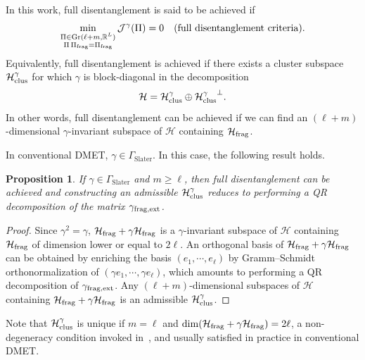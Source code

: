 \documentclass{article}
\def\R{\mathbb R}
\newtheorem{proposition}[theorem]{Proposition}
\newcommand{\1}{{\mathds 1}}
\begin{document}
\medskip

In this work, full disentanglement is said to be achieved if
\begin{equation}\label{eq:full_disentanglement}
\mathop{\rm min}_{
\substack{\Pi \in {\rm Gr}(\ell+m,\R^L) \\ \Pi\,\Pi_{\rm frag}=\Pi_{\rm frag}}
}  \mathcal J^\gamma(\Pi) = 0 \quad \mbox{(full disentanglement criteria)}.
\end{equation}
Equivalently, full disentanglement is achieved if there exists a cluster subspace $\mathcal H_{{\rm clus}}^\gamma$ for which $\gamma$ is block-diagonal in the decomposition 
$$
\mathcal H = \mathcal H_{{\rm clus}}^\gamma \oplus {\mathcal H_{{\rm clus}}^\gamma}^\perp.
$$
In other words, full disentanglement can be achieved if we can find an $(\ell+m)$-dimensional $\gamma$-invariant subspace of $\mathcal H$ containing $\mathcal H_{\rm frag}$. 

\medskip

In conventional DMET, $\gamma \in \Gamma_{\mathrm{Slater}}$. In this case, the following result holds.

\begin{proposition}
\label{prop:DMET_proj_sol}
    If $\gamma \in \Gamma_{\mathrm{Slater}}$ and $m\geq\ell$, then full disentanglement can be achieved and constructing an admissible $\mathcal H_{{\rm clus}}^\gamma$ reduces to performing a QR decomposition of the matrix $\gamma_{\rm frag,ext}$.
    \end{proposition}

\begin{proof} Since $\gamma^2=\gamma$, $\mathcal H_{\rm frag} + \gamma \mathcal H_{\rm frag}$ is a $\gamma$-invariant subspace of $\mathcal H$ containing $\mathcal H_{\rm frag}$ of dimension lower or equal to $2\ell$. An orthogonal basis of $\mathcal H_{\rm frag} + \gamma \mathcal H_{\rm frag}$ can be obtained by enriching the basis $(e_1,\cdots,e_\ell)$ by Gramm--Schmidt orthonormalization of $(\gamma e_1,\cdots,\gamma e_\ell)$, which amounts to performing a QR decomposition of $\gamma_{\rm frag,ext}$. Any $(\ell+m)$-dimensional subspaces of $\mathcal H$ containing  $\mathcal H_{\rm frag} + \gamma \mathcal H_{\rm frag}$ is an admissible $\mathcal H_{{\rm clus}}^\gamma$.
\end{proof}

Note that $\mathcal H_{{\rm clus}}^\gamma$ is unique if $m=\ell$ and ${\rm dim}(\mathcal H_{\rm frag} + \gamma \mathcal H_{\rm frag})=2\ell$, a non-degeneracy condition invoked in~\cite{CFKLL2025}, and usually satisfied in practice in conventional DMET. 
\end{document}
